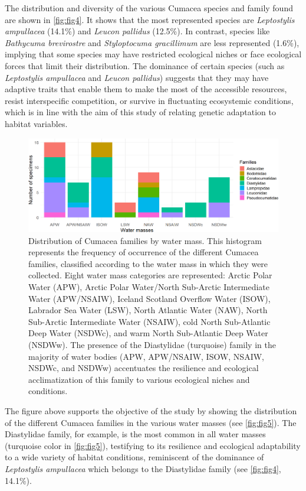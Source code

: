 The distribution and diversity of the various Cumacea species and family found are shown in \autoref{fig:fig4}. It shows that the most represented species are \emph{Leptostylis ampullacea} (14.1\%) and \emph{Leucon pallidus} (12.5\%). In contrast, species like \emph{Bathycuma brevirostre} and \emph{Styloptocuma gracillimum} are less represented (1.6\%), implying that some species may have restricted ecological niches or face ecological forces that limit their distribution. The dominance of certain species (such as \emph{Leptostylis ampullacea} and \emph{Leucon pallidus}) suggests that they may have adaptive traits that enable them to make the most of the accessible resources, resist interspecific competition, or survive in fluctuating ecosystemic conditions, which is in line with the aim of this study of relating genetic adaptation to habitat variables.

\begin{figure}[htbp]
    \centering
    \includegraphics[width=\textwidth]{figure3.png}
    \caption{Distribution of Cumacea families by water mass. This histogram represents the frequency of occurrence of the different Cumacea families, classified according to the water mass in which they were collected. Eight water mass categories are represented: Arctic Polar Water (APW), Arctic Polar Water/North Sub-Arctic Intermediate Water (APW/NSAIW), Iceland Scotland Overflow Water (ISOW), Labrador Sea Water (LSW), North Atlantic Water (NAW), North Sub-Arctic Intermediate Water (NSAIW), cold North Sub-Atlantic Deep Water (NSDWc), and warm North Sub-Atlantic Deep Water (NSDWw). The presence of the Diastylidae (turquoise) family in the majority of water bodies (APW, APW/NSAIW, ISOW, NSAIW, NSDWc, and NSDWw) accentuates the resilience and ecological acclimatization of this family to various ecological niches and conditions. \label{fig:fig5}}
\end{figure}

The figure above supports the objective of the study by showing the distribution of the different Cumacea families in the various water masses (see \autoref{fig:fig5}). The Diastylidae family, for example, is the most common in all water masses (turquoise color in \autoref{fig:fig5}), testifying to its resilience and ecological adaptability to a wide variety of habitat conditions, reminiscent of the dominance of \emph{Leptostylis ampullacea} which belongs to the Diastylidae family (see \autoref{fig:fig4}, 14.1\%).

